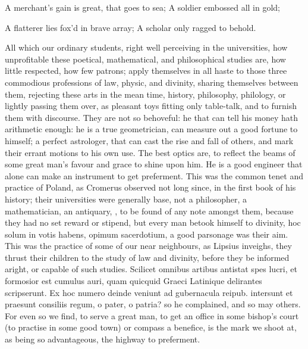 {A merchant's gain is great, that goes to sea;
A soldier embossed all in gold;

A flatterer lies fox'd in brave array;
A scholar only ragged to behold.

All which our ordinary students, right well perceiving in the
universities, how unprofitable these poetical, mathematical, and
philosophical studies are, how little respected, how few patrons; apply
themselves in all haste to those three commodious professions of law,
physic, and divinity, sharing themselves between them, rejecting
these arts in the mean time, history, philosophy, philology, or lightly
passing them over, as pleasant toys fitting only table-talk, and to
furnish them with discourse. They are not so behoveful: he that can
tell his money hath arithmetic enough: he is a true geometrician, can
measure out a good fortune to himself; a perfect astrologer, that can
cast the rise and fall of others, and mark their errant motions to his
own use. The best optics are, to reflect the beams of some great man's
favour and grace to shine upon him. He is a good engineer that alone
can make an instrument to get preferment. This was the common tenet and
practice of Poland, as Cromerus observed not long since, in the first
book of his history; their universities were generally base, not a
philosopher, a mathematician, an antiquary, \etc{}, to be found of any
note amongst them, because they had no set reward or stipend, but every
man betook himself to divinity, hoc solum in votis habens, opimum
sacerdotium, a good parsonage was their aim. This was the practice of
some of our near neighbours, as Lipsius inveighs, they thrust
their children to the study of law and divinity, before they be
informed aright, or capable of such studies. Scilicet omnibus artibus
antistat spes lucri, et formosior est cumulus auri, quam quicquid
Graeci Latinique delirantes scripserunt. Ex hoc numero deinde veniunt
ad gubernacula reipub. intersunt et praesunt consiliis regum, o pater,
o patria? so he complained, and so may others. For even so we find, to
serve a great man, to get an office in some bishop's court (to practise
in some good town) or compass a benefice, is the mark we shoot at, as
being so advantageous, the highway to preferment.

}
